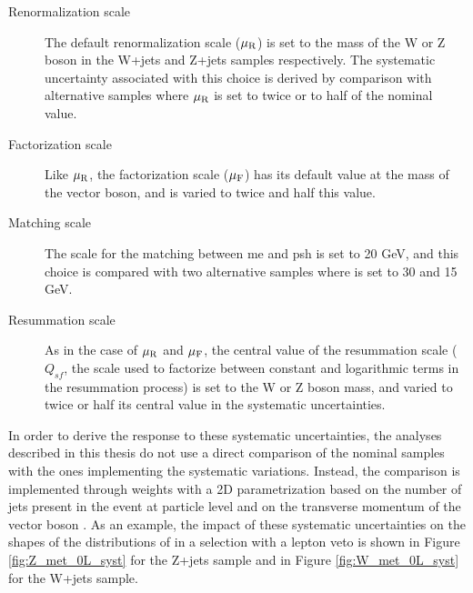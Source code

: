 \begin{description}
\item[Renormalization scale] The default renormalization scale ($\mu_{\rm{R}}$) is set to the mass of the W or Z boson in the W+jets and Z+jets samples respectively. 
The systematic uncertainty associated with this choice is derived by comparison with alternative samples where $\mu_{\rm{R}}$ is set to twice or to half of the nominal value. 

\item[Factorization scale] Like $\mu_{\rm{R}}$, the factorization scale ($\mu_{\rm{F}}$) has its default value at the mass of the vector boson, and is varied to twice and half this value.

\item[Matching scale] The scale for the matching between \gls{me} and \gls{psh} is set to 20 GeV, and this choice is compared with two alternative samples where is set to 30 and 15 GeV.

\item[Resummation scale] As in the case of $\mu_{\rm{R}}$ and $\mu_{\rm{F}}$, the central value of the resummation scale ($Q_{sf}$, the scale used to factorize between constant and logarithmic terms
in the resummation process) is set to the W or Z boson mass, and varied to twice or half its central value in the systematic uncertainties. 

\end{description}

In order to derive the response to these systematic uncertainties, the analyses described in this thesis do not use a direct comparison of the nominal 
samples with the ones implementing the systematic variations.
Instead, the comparison is implemented through weights with a 2D parametrization based on the number of jets present in the event at particle level 
and on the transverse momentum of the vector boson \cite{Anders:2291836}.
As an example, the impact of these systematic uncertainties on the shapes of the distributions of \met in a selection with a lepton veto is shown in Figure \ref{fig:Z_met_0L_syst} for the Z+jets sample and in Figure \ref{fig:W_met_0L_syst} for the W+jets sample.  

